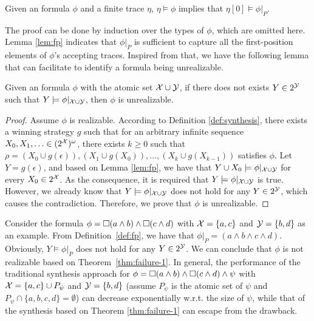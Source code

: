 \begin{lemma}\label{lem:fp}
Given an \ltlf formula $\phi$ and a finite trace $\eta$, $\eta\models\phi$ implies that $\eta[0]\models\phi|_P$.
\end{lemma}
The proof can be done by induction over the types of $\phi$, which are omitted here. Lemma \ref{lem:fp} indicates that $\phi|_P$ is sufficient to capture all the first-position elements of $\phi$'s accepting traces. Inspired from that, we have the following lemma that can facilitate to identify a formula being unrealizable. 

\begin{theorem}\label{thm:failure-1}
Given an \ltlf formula $\phi$ with the atomic set $\mathcal{X}\cup \mathcal{Y}$, if there does not exists $Y\in 2^{\mathcal{Y}}$ such that $Y\models \phi|_{\mathcal{X}\cup\mathcal{Y}}$, then $\phi$ is unrealizable. 
\end{theorem}
\begin{proof}
Assume $\phi$ is realizable. According to Definition \ref{def:synthesis}, there exists a winning strategy $g$ such that for an arbitrary infinite sequence $X_0,X_1,\ldots\in (2^{\mathcal{X}})^{\omega}$, there exists $k\geq 0$ such that $\rho=(X_0\cup g(\epsilon)),(X_1\cup g(X_0)), \ldots, (X_k\cup g(X_{k-1}))$ satisfies $\phi$. Let $Y = g(\epsilon)$, and based on Lemma \ref{lem:fp}, we have that $Y\cup X_0\models \phi|_{\mathcal{X}\cup\mathcal{Y}}$ for every $X_0\in 2^{\mathcal{X}}$. As the consequence, it is required that $Y\models \phi|_{\mathcal{X}\cup\mathcal{Y}}$ is true. However, we already know that $Y\models \phi|_{\mathcal{X}\cup\mathcal{Y}}$ does not hold for any $Y\in 2^{\mathcal{Y}}$, which causes the contradiction. Therefore, we prove that $\phi$ is unrealizable.
\end{proof}

Consider the formula $\phi= \Box (a\wedge b)\wedge \Box (c\wedge d)$ with $\mathcal{X}=\{a,c\}$ and $\mathcal{Y}=\{b,d\}$ as an example. From Definition~\ref{def:fp}, we have that $\phi|_P=(a\wedge b\wedge c\wedge d)$. Obviously, $Y\models \phi|_P$ does not hold for any $Y\in 2^{\mathcal{Y}}$. We can conclude that $\phi$ is not realizable based on Theorem~\ref{thm:failure-1}. In general, the performance of the traditional synthesis approach for $\phi= \Box (a\wedge b)\wedge \Box (c\wedge d) \wedge\psi$ with $\mathcal{X}=\{a,c\}\cup P_{\psi}$ and $\mathcal{Y}=\{b,d\}$ (assume $P_{\psi}$ is the atomic set of $\psi$ and $P_{\psi} \cap \{a,b,c,d\} = \emptyset$) can decrease exponentially w.r.t. the size of $\psi$, while that of the synthesis based on Theorem \ref{thm:failure-1} can escape from the drawback. 

